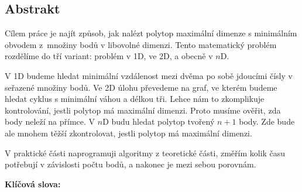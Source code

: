 \subsection*{Abstrakt}

Cílem práce je najít způsob, jak nalézt polytop maximální dimenze s minimálním obvodem z~množiny bodů v libovolné dimenzi. Tento matematický problém rozdělíme do tří variant: problém v 1D, ve 2D, a obecně v $n$D.

V 1D budeme hledat minimální vzdálenost mezi dvěma po sobě jdoucími čísly v seřazené množiny bodů. Ve 2D úlohu převedeme na graf, ve kterém budeme hledat cyklus s minimální váhou a délkou tři. Lehce nám to zkomplikuje kontrolování, jestli polytop má maximální dimenzi. Proto musíme ověřit, zda body neleží na přímce. V $n$D budu hledat polytop tvořený $n+1$ body. Zde bude ale mnohem těžší zkontrolovat, jestli polytop má maximální dimenzi.

V praktické části naprogramuji algoritmy z teoretické části, změřím kolik času potřebují v závislosti počtu bodů, a nakonec je mezi sebou porovnám. 

\vspace{1em}
\noindent
\textbf{Klíčová slova: }\keywordscz

